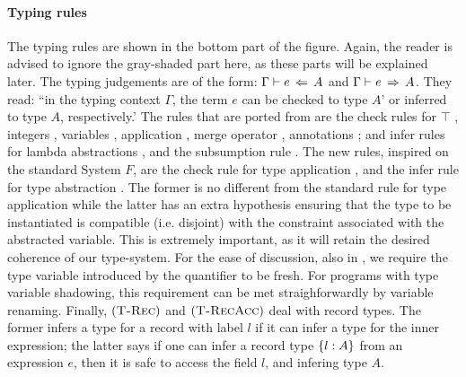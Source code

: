 \paragraph{Typing rules}
The typing rules are shown in the bottom part of the figure. 
Again, the reader is advised to ignore the
gray-shaded part here, as these parts will be explained later. 
The typing judgements are of the form: $\Gamma \vdash e \ \!\Leftarrow\! \ A$ and  
$\Gamma \vdash e \ \!\Rightarrow\! \ A$.
They read: ``in the typing context $\Gamma$, the term $e$ can be checked to
type $A$' or inferred to type $A$, respectively.' 
The rules that are ported from \oldname are the
check rules for $\top$ , integers , 
variables ,  application , merge operator  
, annotations ; and infer rules
for lambda abstractions , and the subsumption rule 
.
The new rules, inspired on the standard System $F$, are the check rule for
type application , and the infer rule for type abstraction
.
The former is no different from the standard rule for type application while
the latter has an extra hypothesis ensuring that the type to be instantiated is
compatible (i.e. disjoint) with the constraint associated with the abstracted variable.
This is extremely important, as it will retain the desired coherence of our 
type-system.
For the ease of discussion, also in , we require the 
type variable introduced by the quantifier to be fresh. 
For programs with type variable shadowing, this requirement can be met 
straighforwardly by variable renaming.
Finally, $(\textsc{T-Rec})$ and $(\textsc{T-RecAcc})$ deal with record types.
The former infers a type for a record with label $l$ if it can infer a type for the
inner expression; the latter says if one can infer a record type $\{ l : A \}$ 
from an expression $e$, then it is safe to access the field $l$, and infering type $A$.

